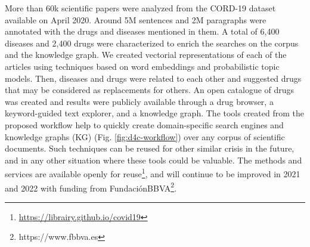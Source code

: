 More than 60k scientific papers were analyzed from the CORD-19 dataset available on April 2020. Around 5M sentences and 2M paragraphs were annotated with the drugs and diseases mentioned in them. A total of 6,400 diseases and 2,400 drugs were characterized to enrich the searches on the corpus and the knowledge graph. We created vectorial representations of each of the articles using techniques based on word embeddings and probabilistic topic models. Then, diseases and drugs were related to each other and suggested drugs that may be considered as replacements for others. An open catalogue of drugs was created and results were publicly available through a drug browser, a keyword-guided text explorer, and a knowledge graph. The tools created from the proposed workflow help to quickly create domain-specific search engines and knowledge graphs (KG) (Fig. \ref{fig:d4c-workflow}) over any corpus of scientific documents. Such techniques can be reused for other similar crisis in the future, and in any other situation where these tools could be valuable. The methods and services are available openly for reuse\footnote{\url{https://librairy.github.io/covid19}}, and will continue to be improved in 2021 and 2022 with funding from FundaciónBBVA\footnote{https://www.fbbva.es}. 









